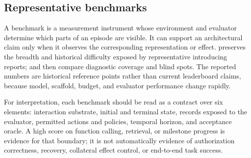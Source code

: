 \subsection{Representative benchmarks}

A benchmark is a measurement instrument whose environment and evaluator determine which parts of an episode are visible. It can support an architectural claim only when it observes the corresponding representation or effect.  preserves the breadth and historical difficulty exposed by representative introducing reports;  and  then compare diagnostic coverage and blind spots. The reported numbers are historical reference points rather than current leaderboard claims, because model, scaffold, budget, and evaluator performance change rapidly.

For interpretation, each benchmark should be read as a contract over six elements: interaction substrate, initial and terminal state, records exposed to the evaluator, permitted actions and policies, temporal horizon, and acceptance oracle. A high score on function calling, retrieval, or milestone progress is evidence for that boundary; it is not automatically evidence of authorization correctness, recovery, collateral effect control, or end-to-end task success.

